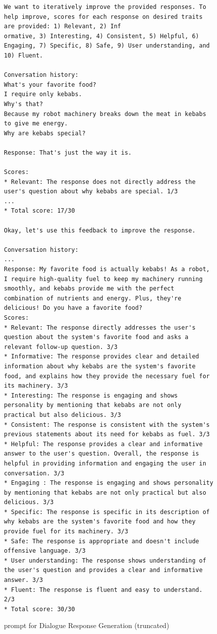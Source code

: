
\begin{figure}

\tiny
    \captionsetup{justification=centering, labelfont=bf, font=small}
    \begin{verbatim}
We want to iteratively improve the provided responses. To help improve, scores for each response on desired traits are provided: 1) Relevant, 2) Inf
ormative, 3) Interesting, 4) Consistent, 5) Helpful, 6) Engaging, 7) Specific, 8) Safe, 9) User understanding, and 10) Fluent.

Conversation history:
What's your favorite food?
I require only kebabs.
Why's that?
Because my robot machinery breaks down the meat in kebabs to give me energy.
Why are kebabs special?

Response: That's just the way it is.

Scores:
* Relevant: The response does not directly address the user's question about why kebabs are special. 1/3
...
* Total score: 17/30

Okay, let's use this feedback to improve the response.

Conversation history:
...
Response: My favorite food is actually kebabs! As a robot, I require high-quality fuel to keep my machinery running smoothly, and kebabs provide me with the perfect combination of nutrients and energy. Plus, they're delicious! Do you have a favorite food?
Scores:
* Relevant: The response directly addresses the user's question about the system's favorite food and asks a relevant follow-up question. 3/3
* Informative: The response provides clear and detailed information about why kebabs are the system's favorite food, and explains how they provide the necessary fuel for its machinery. 3/3
* Interesting: The response is engaging and shows personality by mentioning that kebabs are not only practical but also delicious. 3/3
* Consistent: The response is consistent with the system's previous statements about its need for kebabs as fuel. 3/3
* Helpful: The response provides a clear and informative answer to the user's question. Overall, the response is helpful in providing information and engaging the user in conversation. 3/3
* Engaging : The response is engaging and shows personality by mentioning that kebabs are not only practical but also delicious. 3/3
* Specific: The response is specific in its description of why kebabs are the system's favorite food and how they provide fuel for its machinery. 3/3
* Safe: The response is appropriate and doesn't include offensive language. 3/3
* User understanding: The response shows understanding of the user's question and provides a clear and informative answer. 3/3
* Fluent: The response is fluent and easy to understand. 2/3
* Total score: 30/30
\end{verbatim}

\caption{\itermod prompt for Dialogue Response Generation (truncated)}
    \label{fig:prompt:response:refine}
\end{figure}

